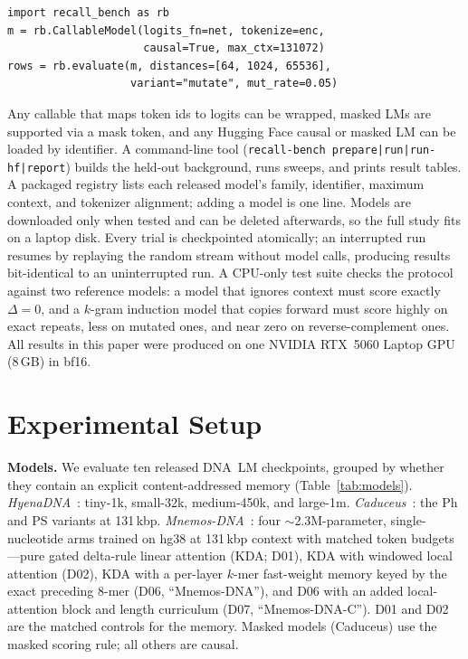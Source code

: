 \begin{small}
\begin{verbatim}
import recall_bench as rb
m = rb.CallableModel(logits_fn=net, tokenize=enc,
                     causal=True, max_ctx=131072)
rows = rb.evaluate(m, distances=[64, 1024, 65536],
                   variant="mutate", mut_rate=0.05)
\end{verbatim}
\end{small}

\noindent Any callable that maps token ids to logits can be wrapped, masked LMs are supported
via a mask token, and any Hugging Face causal or masked LM can be loaded by identifier. A
command-line tool (\texttt{recall-bench prepare|run|run-hf|report}) builds the held-out
background, runs sweeps, and prints result tables. A packaged registry lists each released
model's family, identifier, maximum context, and tokenizer alignment; adding a model is one
line. Models are downloaded only when tested and can be deleted afterwards, so the full study
fits on a laptop disk. Every trial is checkpointed atomically; an interrupted run resumes by
replaying the random stream without model calls, producing results bit-identical to an
uninterrupted run. A CPU-only test suite checks the protocol against two reference models: a
model that ignores context must score exactly $\Delta=0$, and a $k$-gram induction model that
copies forward must score highly on exact repeats, less on mutated ones, and near zero on
reverse-complement ones. All results in this paper were produced on one NVIDIA RTX~5060
Laptop GPU (8\,GB) in bf16.

\section{Experimental Setup}
\label{sec:setup}

\textbf{Models.} We evaluate ten released DNA~LM checkpoints, grouped by whether they contain
an explicit content-addressed memory (Table~\ref{tab:models}).
\emph{HyenaDNA}~\cite{nguyen2023hyenadna}: tiny-1k, small-32k, medium-450k, and large-1m.
\emph{Caduceus}~\cite{schiff2024caduceus}: the Ph and PS variants at 131\,kbp.
\emph{Mnemos-DNA}~\cite{balyan2026mnemos}: four $\sim$2.3M-parameter, single-nucleotide arms
trained on hg38 at 131\,kbp context with matched token budgets---pure gated delta-rule
linear attention (KDA; D01), KDA with windowed local attention (D02), KDA with a per-layer
$k$-mer fast-weight memory keyed by the exact preceding 8-mer (D06, ``Mnemos-DNA''), and D06
with an added local-attention block and length curriculum (D07, ``Mnemos-DNA-C''). D01 and D02
are the matched controls for the memory. Masked models (Caduceus) use the masked scoring rule;
all others are causal.

